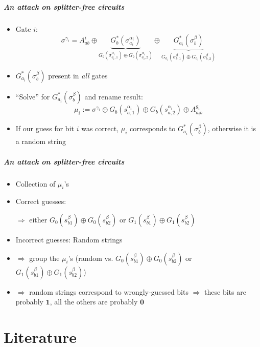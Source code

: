 \documentclass{beamer}
\begin{document}
\begin{frame}
  \frametitle{An attack on splitter-free circuits}
  \begin{itemize}
  \item Gate $i$:
    \begin{equation*}
        \sigma^{\gamma_i} = A^i_{ab} \oplus \underbrace{G^*_b(\sigma^{\alpha_i}_{a_i})}_{G_b(\sigma^{\alpha_i}_{a_i,1}) \oplus G_b(\sigma^{\alpha_i}_{a_i,2})} \oplus \underbrace{G^*_{a_i}(\sigma^\beta_b)}_{G_{a_i}(\sigma^\beta_{b,1}) \oplus G_{a_i}(\sigma^\beta_{b,2})}
    \end{equation*}
  \item $G^*_{a_i}(\sigma^{\beta}_{b})$ present in \emph{all} gates
  \item ``Solve'' for $G^*_{a_i}(\sigma^\beta_b)$ and rename result:
    \begin{equation*}
        \mu_i:=\sigma^{\gamma_i}\oplus G_b(s^{\alpha_i}_{a,1}) \oplus G_b(s^{\alpha_i}_{a,2}) \oplus A^{g_i}_{a_i b}
    \end{equation*}
  \item If our guess for bit $i$ was correct, $\mu_i$ corresponds to $G^*_{a_i}(\sigma^\beta_b)$, otherwise it is a random string
  \end{itemize}
\end{frame}

\begin{frame}
  \frametitle{An attack on splitter-free circuits}
  \begin{itemize}
  \item Collection of $\mu_i$'s
  \item Correct guesses:

    $\Rightarrow$ either $G_0(s^\beta_{b1})\oplus G_0(s^\beta_{b2})$ or $G_1(s^\beta_{b1})\oplus G_1(s^\beta_{b2})$
  \item Incorrect guesses: Random strings
  \item $\Rightarrow$ group the $\mu_i$'s (random vs. $G_0(s^\beta_{b1})\oplus G_0(s^\beta_{b2})$ or $G_1(s^\beta_{b1})\oplus G_1(s^\beta_{b2})$)
  \item $\Rightarrow$ random strings correspond to wrongly-guessed bits $\Rightarrow$ these bits are probably $\mathbf{1}$, all the others are probably $\mathbf{0}$
  \end{itemize}
\end{frame}

\part{Literature}
\label{part:literature}
\end{document}
